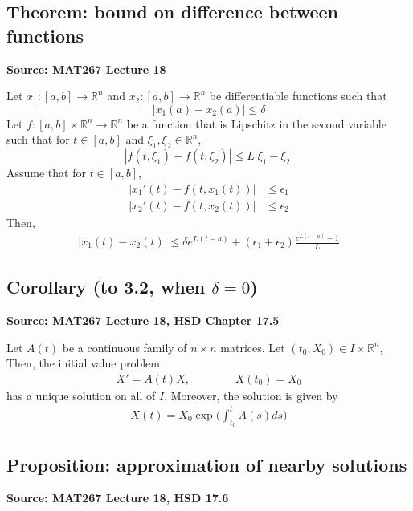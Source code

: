 \documentclass[11pt]{article}
\newcommand{\R}{\mathbb{R}}
\begin{document}
\subsection{Theorem: bound on difference between functions}
\textbf{Source: MAT267 Lecture 18}

Let $x_1: [a,b] \to \R^n$ and $x_2: [a,b] \to \R^n$ be differentiable functions such that $$|x_1(a) - x_2(a)| \leq \delta$$ Let $f: [a,b] \times \R^n \to \R^n$ be a function that is Lipschitz in the second variable such that for $t \in [a,b]$ and $\xi_1, \xi_2 \in \R^n$, $$|f(t, \xi_1) - f(t, \xi_2)| \leq L|\xi_1 - \xi_2|$$
Assume that for $t \in [a,b]$, 
\begin{align*}
    |x_1'(t) - f(t, x_1(t))| &\leq \epsilon_1 \\
    |x_2'(t) - f(t, x_2(t))| &\leq \epsilon_2 
\end{align*}
Then, 
\begin{align*}
    |x_1(t) - x_2(t)| \leq \delta e^{L(t-a)} + (\epsilon_1 + \epsilon_2) \frac{e^{L(t-a)} - 1}{L}
\end{align*}

\subsection{Corollary (to 3.2, when $\delta = 0$)}
\textbf{Source: MAT267 Lecture 18, HSD Chapter 17.5}

Let $A(t)$ be a continuous family of $n \times n$ matrices. Let $(t_0, X_0) \in I \times \R^n$, Then, the initial value problem 
\begin{align*}
    X' = A(t) X, ~~~~~~~~~~~~~~~~~~ X(t_0) = X_0
\end{align*}
has a unique solution on all of $I$. Moreover, the solution is given by 
\begin{align*}
    X(t) = X_0 \exp\Big(\int_{t_0}^t A(s) ds\Big)
\end{align*}

\subsection{Proposition: approximation of nearby solutions}
\textbf{Source: MAT267 Lecture 18, HSD 17.6}
\end{document}

